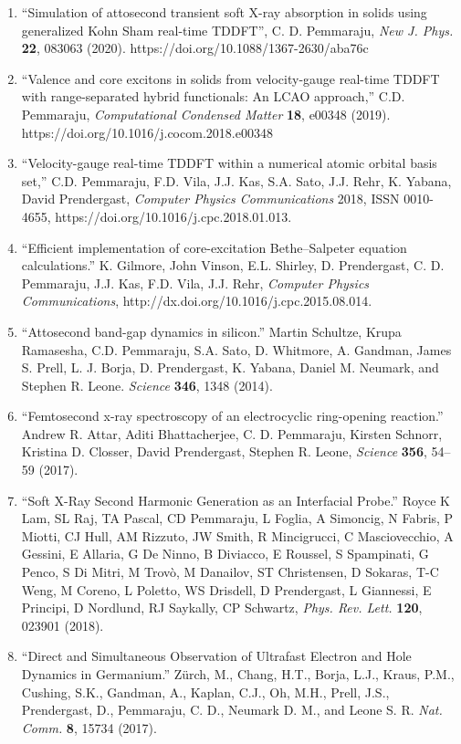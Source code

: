 \begin{enumerate}
    \item “Simulation of attosecond transient soft X-ray absorption in solids using generalized Kohn Sham real-time TDDFT”, C. D. Pemmaraju, {\it New J. Phys.} {\bf 22}, 083063 (2020). https://doi.org/10.1088/1367-2630/aba76c
    \item “Valence and core excitons in solids from velocity-gauge real-time TDDFT with range-separated hybrid functionals: An LCAO approach,” C.D. Pemmaraju, {\it Computational Condensed Matter} {\bf 18}, e00348 (2019).  https://doi.org/10.1016/j.cocom.2018.e00348
    \item “Velocity-gauge real-time TDDFT within a numerical atomic orbital basis set,” C.D. Pemmaraju, F.D. Vila, J.J. Kas, S.A. Sato, J.J. Rehr, K. Yabana, David Prendergast, {\it Computer Physics Communications} 2018, ISSN 0010-4655, https://doi.org/10.1016/j.cpc.2018.01.013.
    \item “Efficient implementation of core-excitation Bethe–Salpeter equation calculations.” K. Gilmore,  John Vinson, E.L. Shirley, D. Prendergast, C. D. Pemmaraju,  J.J. Kas, F.D. Vila,  J.J. Rehr, {\it Computer Physics Communications}, http://dx.doi.org/10.1016/j.cpc.2015.08.014.
    \item “Attosecond band-gap dynamics in silicon.” Martin Schultze, Krupa Ramasesha, C.D. Pemmaraju, S.A. Sato, D. Whitmore, A. Gandman, James S. Prell, L. J. Borja, D. Prendergast, K. Yabana, Daniel M. Neumark, and Stephen R. Leone. {\it Science} {\bf 346}, 1348 (2014).
    \item “Femtosecond x-ray spectroscopy of an electrocyclic ring-opening reaction.” Andrew R. Attar, Aditi Bhattacherjee, C. D. Pemmaraju, Kirsten Schnorr, Kristina D. Closser, David Prendergast, Stephen R. Leone, {\it Science} {\bf 356}, 54–59 (2017).
    \item “Soft X-Ray Second Harmonic Generation as an Interfacial Probe.” Royce K Lam, SL Raj, TA Pascal, CD Pemmaraju, L Foglia, A Simoncig, N Fabris, P Miotti, CJ Hull, AM Rizzuto, JW Smith, R Mincigrucci, C Masciovecchio, A Gessini, E Allaria, G De Ninno, B Diviacco, E Roussel, S Spampinati, G Penco, S Di Mitri, M Trovò, M Danailov, ST Christensen, D Sokaras, T-C Weng, M Coreno, L Poletto, WS Drisdell, D Prendergast, L Giannessi, E Principi, D Nordlund, RJ Saykally, CP Schwartz, {\it Phys. Rev. Lett.} {\bf 120}, 023901 (2018).
    \item “Direct and Simultaneous Observation of Ultrafast Electron and Hole Dynamics in Germanium.” Zürch, M., Chang, H.T., Borja, L.J., Kraus, P.M., Cushing, S.K., Gandman, A., Kaplan, C.J., Oh, M.H., Prell, J.S., Prendergast, D., Pemmaraju, C. D., Neumark D. M., and Leone S. R. {\it Nat. Comm.} {\bf 8}, 15734 (2017).

\end{enumerate}
